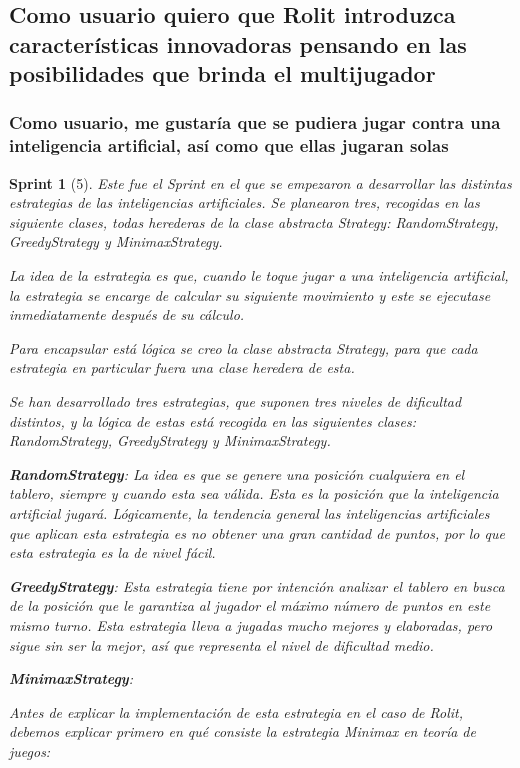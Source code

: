\documentclass{article}
\theoremstyle{break}
\newtheorem*{sprint}{Sprint}
\begin{document}
\subsection{Como usuario quiero que Rolit introduzca características innovadoras pensando en las posibilidades que brinda el multijugador}

\subsubsection{Como usuario, me gustaría que se pudiera jugar contra una inteligencia artificial, así como que ellas jugaran solas}
\begin{sprint}[5]
Este fue el Sprint en el que se empezaron a desarrollar las distintas estrategias de las inteligencias artificiales. Se planearon tres, recogidas en las siguiente clases, todas herederas de la clase abstracta Strategy: RandomStrategy, GreedyStrategy y MinimaxStrategy.

La idea de la estrategia es que, cuando le toque jugar a una inteligencia artificial, la estrategia se encarge de calcular
su siguiente movimiento y este se ejecutase inmediatamente después de su cálculo.

Para encapsular está lógica se creo la clase abstracta Strategy, para que cada estrategia en particular fuera una clase
heredera de esta.

Se han desarrollado tres estrategias, que suponen tres niveles de dificultad distintos, 
y la lógica de estas está recogida en las siguientes clases: RandomStrategy, GreedyStrategy y MinimaxStrategy.

\textbf{RandomStrategy}:
La idea es que se genere una posición cualquiera en el tablero, siempre y cuando esta sea válida. Esta es la posición que la inteligencia artificial jugará.
Lógicamente, la tendencia general las inteligencias artificiales que aplican esta estrategia es no obtener una gran cantidad de puntos, por lo que esta estrategia es la de nivel fácil.

\textbf{GreedyStrategy}:
Esta estrategia tiene por intención analizar el tablero en busca de la posición que le garantiza al jugador el máximo número de puntos en este mismo turno. Esta estrategia lleva a jugadas mucho mejores y elaboradas, pero sigue sin ser la mejor, así que representa el nivel de dificultad medio.

\textbf{MinimaxStrategy}:

Antes de explicar la implementación de esta estrategia en el caso de Rolit, debemos explicar primero en qué consiste la estrategia Minimax en teoría de juegos:


\end{sprint}
\end{document}
